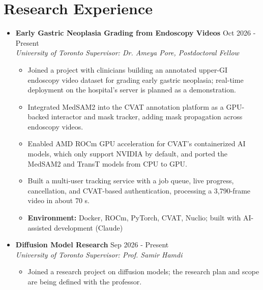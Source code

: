 \documentclass{article}
\begin{document}
\section*{Research Experience}
\begin{itemize}
  \item[] \textbf{Early Gastric Neoplasia Grading from Endoscopy Videos} \hfill Oct 2026 - Present \\
  \textit{University of Toronto} \hfill \textit{Supervisor: Dr. Ameya Pore, Postdoctoral Fellow}
  \vspace{-5px}
  \begin{itemize}
    \item Joined a project with clinicians building an annotated upper-GI endoscopy video dataset for grading early gastric neoplasia; real-time deployment on the hospital's server is planned as a demonstration.
    \item Integrated MedSAM2 into the CVAT annotation platform as a GPU-backed interactor and mask tracker, adding mask propagation across endoscopy videos.
    \item Enabled AMD ROCm GPU acceleration for CVAT's containerized AI models, which only support NVIDIA by default, and ported the MedSAM2 and TransT models from CPU to GPU.
    \item Built a multi-user tracking service with a job queue, live progress, cancellation, and CVAT-based authentication, processing a 3,790-frame video in about 70 s.
    \item \textbf{Environment:} Docker, ROCm, PyTorch, CVAT, Nuclio; built with AI-assisted development (Claude)
  \end{itemize}
  \vspace{3px}

  \item[] \begin{minipage}[t]{\linewidth}
  \textbf{Diffusion Model Research} \hfill Sep 2026 - Present \\
  \textit{University of Toronto} \hfill \textit{Supervisor: Prof. Samir Hamdi}
  \vspace{-5px}
  \setlength{\leftmargini}{2.2em}
  \begin{itemize}
    \item Joined a research project on diffusion models; the research plan and scope are being defined with the professor.
  \end{itemize}
  \end{minipage}
  \vspace{3px}


\end{itemize}
\end{document}
